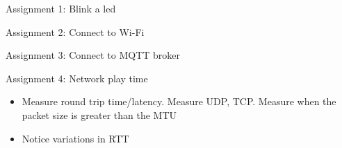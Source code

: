 \begin{frame}{Assignment 1: Blink a led}
\protect\hypertarget{assignment-1-blink-a-led}{}

\end{frame}

\begin{frame}{Assignment 2: Connect to Wi-Fi}
\protect\hypertarget{assignment-2-connect-to-wi-fi}{}

\end{frame}

\begin{frame}{Assignment 3: Connect to MQTT broker}
\protect\hypertarget{assignment-3-connect-to-mqtt-broker}{}

\end{frame}

\begin{frame}{Assignment 4: Network play time}
\protect\hypertarget{assignment-4-network-play-time}{}

\begin{itemize}
\item
  Measure round trip time/latency. Measure UDP, TCP. Measure when the
  packet size is greater than the MTU
\item
  Notice variations in RTT
\end{itemize}

\end{frame}
